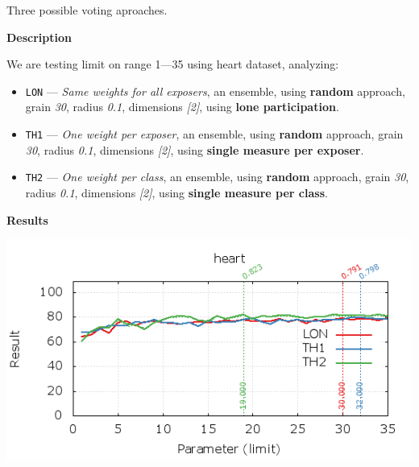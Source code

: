 \begin{experiment}{Three possible voting aproaches.}{\small \sffamily\textbf{Description}

We are testing limit on range 1---35 using heart dataset, analyzing:

\begin{itemize}
\tightlist
	\item \texttt{LON} --- \emph{Same weights for all \emph{exposers}}, an ensemble, using \textbf{random} approach, grain \emph{30}, radius \emph{0.1}, dimensions \emph{[2]}, using \textbf{lone participation}.
	\item \texttt{TH1} --- \emph{One weight per \emph{exposer}}, an ensemble, using \textbf{random} approach, grain \emph{30}, radius \emph{0.1}, dimensions \emph{[2]}, using \textbf{single measure per exposer}.
	\item \texttt{TH2} --- \emph{One weight per \emph{class}}, an ensemble, using \textbf{random} approach, grain \emph{30}, radius \emph{0.1}, dimensions \emph{[2]}, using \textbf{single measure per class}.

\end{itemize}


\textbf{Results}

\centering
	\includegraphics[width=.75\textwidth]{plots/experiment_5_heart.png}
	\label{fig:experiment_5}
}\end{experiment}